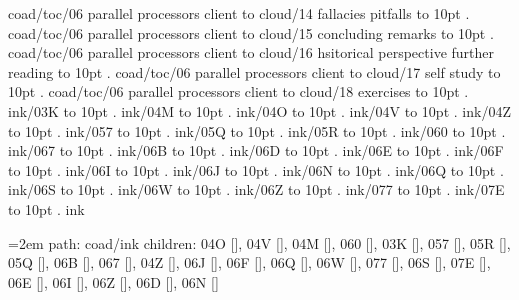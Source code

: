 \smallskip
coad/toc/06 parallel processors client to cloud/14 fallacies pitfalls \leaders\hbox to 10pt {\hss.\hss}  \hfill {}
\smallskip
coad/toc/06 parallel processors client to cloud/15 concluding remarks \leaders\hbox to 10pt {\hss.\hss}  \hfill {}
\smallskip
coad/toc/06 parallel processors client to cloud/16 hsitorical perspective further reading \leaders\hbox to 10pt {\hss.\hss}  \hfill {}
\smallskip
coad/toc/06 parallel processors client to cloud/17 self study \leaders\hbox to 10pt {\hss.\hss}  \hfill {}
\smallskip
coad/toc/06 parallel processors client to cloud/18 exercises \leaders\hbox to 10pt {\hss.\hss}  \hfill {}
\smallskip
ink/03K \leaders\hbox to 10pt {\hss.\hss}  \hfill {}
\smallskip
ink/04M \leaders\hbox to 10pt {\hss.\hss}  \hfill {}
\smallskip
ink/04O \leaders\hbox to 10pt {\hss.\hss}  \hfill {}
\smallskip
ink/04V \leaders\hbox to 10pt {\hss.\hss}  \hfill {}
\smallskip
ink/04Z \leaders\hbox to 10pt {\hss.\hss}  \hfill {}
\smallskip
ink/057 \leaders\hbox to 10pt {\hss.\hss}  \hfill {}
\smallskip
ink/05Q \leaders\hbox to 10pt {\hss.\hss}  \hfill {}
\smallskip
ink/05R \leaders\hbox to 10pt {\hss.\hss}  \hfill {}
\smallskip
ink/060 \leaders\hbox to 10pt {\hss.\hss}  \hfill {}
\smallskip
ink/067 \leaders\hbox to 10pt {\hss.\hss}  \hfill {}
\smallskip
ink/06B \leaders\hbox to 10pt {\hss.\hss}  \hfill {}
\smallskip
ink/06D \leaders\hbox to 10pt {\hss.\hss}  \hfill {}
\smallskip
ink/06E \leaders\hbox to 10pt {\hss.\hss}  \hfill {}
\smallskip
ink/06F \leaders\hbox to 10pt {\hss.\hss}  \hfill {}
\smallskip
ink/06I \leaders\hbox to 10pt {\hss.\hss}  \hfill {}
\smallskip
ink/06J \leaders\hbox to 10pt {\hss.\hss}  \hfill {}
\smallskip
ink/06N \leaders\hbox to 10pt {\hss.\hss}  \hfill {}
\smallskip
ink/06Q \leaders\hbox to 10pt {\hss.\hss}  \hfill {}
\smallskip
ink/06S \leaders\hbox to 10pt {\hss.\hss}  \hfill {}
\smallskip
ink/06W \leaders\hbox to 10pt {\hss.\hss}  \hfill {}
\smallskip
ink/06Z \leaders\hbox to 10pt {\hss.\hss}  \hfill {}
\smallskip
ink/077 \leaders\hbox to 10pt {\hss.\hss}  \hfill {}
\smallskip
ink/07E \leaders\hbox to 10pt {\hss.\hss}  \hfill {}
\smallskip
\vfill \break
{}
ink
\smallskip
\par\begingroup
\leftskip=2em
path: coad/ink
\smallskip
children: 04O [], 04V [], 04M [], 060 [], 03K [], 057 [], 05R [], 05Q [], 06B [], 067 [], 04Z [], 06J [], 06F [], 06Q [], 06W [], 077 [], 06S [], 07E [], 06E [], 06I [], 06Z [], 06D [], 06N []
